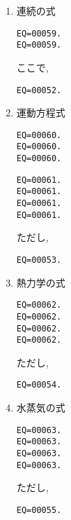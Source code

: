 \begin{enumerate}
\item 連続の式

\begin{verbatim}
EQ=00059.
EQ=00059.
\end{verbatim}
%
ここで,
\begin{verbatim}
EQ=00052.
\end{verbatim}

\item 運動方程式

\begin{verbatim}
EQ=00060.
EQ=00060.
EQ=00060.
\end{verbatim}
%
\begin{verbatim}
EQ=00061.
EQ=00061.
EQ=00061.
EQ=00061.
\end{verbatim}
%
ただし,
%
\begin{verbatim}
EQ=00053.
\end{verbatim}

\item 熱力学の式

\begin{verbatim}
EQ=00062.
EQ=00062.
EQ=00062.
EQ=00062.
\end{verbatim}
%
ただし,
%
\begin{verbatim}
EQ=00054.
\end{verbatim}



\item 水蒸気の式

\begin{verbatim}
EQ=00063.
EQ=00063.
EQ=00063.
EQ=00063.
\end{verbatim}

ただし,
%
\begin{verbatim}
EQ=00055.
\end{verbatim}



\end{enumerate}

